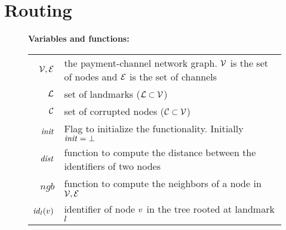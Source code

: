 \section{Routing}
\label{sec:routing}

\begin{figure*}[htb]
	\begin{center}	
		\textbf{Variables and functions:}
		
		\begin{tabular}{r l}
			$\mathcal{V},\mathcal{E}$ & the payment-channel network graph. $\mathcal{V}$ is the set of nodes and $\mathcal{E}$ is the set of channels\\
			$\mathcal{L}$ & set of landmarks ($\mathcal{L} \subset \mathcal{V}$) \\
			$\mathcal{C}$ & set of corrupted nodes ($\mathcal{C} \subset \mathcal{V}$) \\
			$\mathit{init}$ & Flag to initialize the functionality. Initially $\mathit{init} = \bot$\\
			$\mathit{dist}$ & function to compute the distance between the identifiers of two nodes\\
			$\textit{ngb}$ & function to compute the neighbors of a node in $\mathcal{V},\mathcal{E}$\\
			$\mathit{id}_{l}(v)$ & identifier of node $v$ in the tree rooted at landmark $l$ 
		\end{tabular}
\end{center}
\end{figure*}
